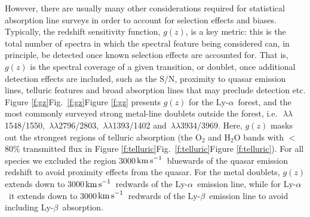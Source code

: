 \documentclass[fleqn,usenatbib,usedcolumn]{mnras}
\newcommand{\Fref}[1]{\ifhmode \ifnum\spacefactor=1001 Figure \ref{#1}\else Fig.\ \ref{#1}\fi \else Figure \ref{#1}\fi}
\newcommand{\kms}{\ensuremath{\textrm{km\,s}^{-1}}}
\newcommand{\SN}{\ensuremath{\textrm{S/N}}}
\newcommand{\lya}{\ensuremath{\textrm{Ly-}\alpha}}
\newcommand{\lyb}{\ensuremath{\textrm{Ly-}\beta}}
\begin{document}
However, there are usually many other considerations required for statistical absorption line surveys in order to account for selection effects and biases. Typically, the redshift sensitivity function, $g(z)$, is a key metric: this is the total number of spectra in which the spectral feature being considered can, in principle, be detected once known selection effects are accounted for. That is, $g(z)$ is the spectral coverage of a given transition, or doublet, once additional detection effects are included, such as the \SN, proximity to quasar emission lines, telluric features and broad absorption lines that may preclude detection etc. \Fref{f:gz} presents $g(z)$ for the \lya\ forest, and the most commonly surveyed strong metal-line doublets outside the forest, i.e.\ \,$\lambda\lambda$1548/1550, \,$\lambda\lambda$2796/2803, \,$\lambda\lambda$1393/1402 and \,$\lambda\lambda$3934/3969. Here, $g(z)$ masks out the strongest regions of telluric absorption (the O$_2$ and H$_2$O bands with $<$80\% transmitted flux in \Fref{f:telluric}). For all species we excluded the region 3000\,\kms\ bluewards of the quasar emission redshift to avoid proximity effects from the quasar. For the metal doublets, $g(z)$ extends down to 3000\,\kms\ redwards of the \lya\ emission line, while for \lya\ it extends down to 3000\,\kms\ redwards of the \lyb\ emission line to avoid including \lyb\ absorption.
\end{document}
